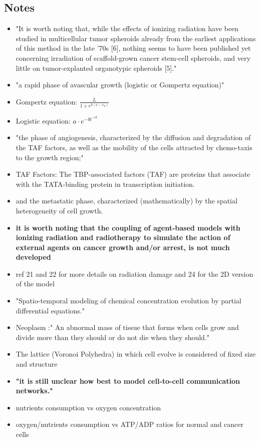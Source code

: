\documentclass[11pt,a4paper]{article}
\begin{document}
\subsection*{Notes}
\begin{itemize}
\item "It is worth noting that, while the effects of ionizing radiation have been studied in multicellular tumor spheroids already from the earliest applications of this method in the late ’70s [6], nothing seems to have been published yet concerning irradiation of scaffold-grown cancer stem-cell spheroids, and very little on tumor-explanted organotypic spheroids [5]."
\item  "a rapid phase of avascular growth (logistic or Gompertz equation)"
\item Gompertz equation: $\frac{L}{1+ e^{k(x-x_{0})}}$
\item Logistic equation: $a \cdot e^{-bt^{-ct}}$
\item "the phase of angiogenesis, characterized by the diffusion and degradation of the TAF factors, as well as the
mobility of the cells attracted by chemo-taxis to the growth region;"
\item TAF Factors: The TBP-associated factors (TAF) are proteins that associate with the TATA-binding protein in transcription initiation.
\item and the metastatic phase, characterized (mathematically) by the spatial heterogeneity of cell growth.
\item \textbf{it is worth noting that the coupling of agent-based models with ionizing radiation and radiotherapy to simulate the action of external agents on cancer growth and/or arrest, is not much developed}
\item ref 21 and 22 for more details on radiation damage and 24 for the 2D version of the model
\item "Spatio-temporal modeling of chemical concentration evolution by partial differential equations."
\item Neoplasm :" An abnormal mass of tissue that forms when cells grow and divide more than they should or do not die when they should."
\item The lattice (Voronoi Polyhedra) in which cell evolve is considered of fixed size and structure
\item \textbf{"it is still unclear how best to model cell-to-cell communication networks."}
\item nutrients consumption vs oxygen concentration
\item oxygen/nutrients consumption vs ATP/ADP ratios for normal and cancer cells

\end{itemize}
\end{document}
